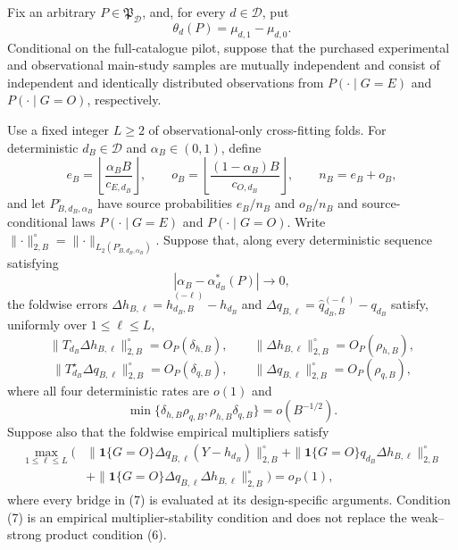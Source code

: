 Fix an arbitrary \(P\in\mathfrak P_{\mathcal D}\), and, for every \(d\in\mathcal D\), put
\[
 \theta_d(P)=\mu_{d,1}-\mu_{d,0}.                            \tag{1}
\]
Conditional on the full-catalogue pilot, suppose that the purchased experimental and observational main-study samples are mutually independent and consist of independent and identically distributed observations from \(P(\mathord\cdot\mid G=E)\) and \(P(\mathord\cdot\mid G=O)\), respectively.

Use a fixed integer \(L\ge2\) of observational-only cross-fitting folds.  For deterministic \(d_B\in\mathcal D\) and \(\alpha_B\in(0,1)\), define
\[
 e_B=\left\lfloor\frac{\alpha_BB}{c_{E,d_B}}\right\rfloor,
 \qquad
 o_B=\left\lfloor\frac{(1-\alpha_B)B}{c_{O,d_B}}\right\rfloor,
 \qquad n_B=e_B+o_B,                                        \tag{2}
\]
and let \(P_{B,d_B,\alpha_B}^{\circ}\) have source probabilities \(e_B/n_B\) and \(o_B/n_B\) and source-conditional laws \(P(\mathord\cdot\mid G=E)\) and \(P(\mathord\cdot\mid G=O)\).  Write \(\|\mathord\cdot\|_{2,B}^{\circ}=\|\mathord\cdot\|_{L_2(P_{B,d_B,\alpha_B}^{\circ})}\).  Suppose that, along every deterministic sequence satisfying
\[
 |\alpha_B-\alpha_{d_B}^*(P)|\longrightarrow0,               \tag{3}
\]
the foldwise errors \(\Delta h_{B,\ell}=\widehat h_{d_B,B}^{(-\ell)}-h_{d_B}\) and \(\Delta q_{B,\ell}=\widehat q_{d_B,B}^{(-\ell)}-q_{d_B}\) satisfy, uniformly over \(1\le\ell\le L\),
\[
 \|T_{d_B}\Delta h_{B,\ell}\|_{2,B}^{\circ}=O_P(\delta_{h,B}),
 \qquad
 \|\Delta h_{B,\ell}\|_{2,B}^{\circ}=O_P(\rho_{h,B}),       \tag{4}
\]
\[
 \|T_{d_B}^{\star}\Delta q_{B,\ell}\|_{2,B}^{\circ}=O_P(\delta_{q,B}),
 \qquad
 \|\Delta q_{B,\ell}\|_{2,B}^{\circ}=O_P(\rho_{q,B}),       \tag{5}
\]
where all four deterministic rates are \(o(1)\) and
\[
 \min\{\delta_{h,B}\rho_{q,B},\rho_{h,B}\delta_{q,B}\}
 =o(B^{-1/2}).                                                \tag{6}
\]
Suppose also that the foldwise empirical multipliers satisfy
\[
\begin{aligned}
 \max_{1\le\ell\le L}\bigl(&
 \|\mathbf 1\{G=O\}\Delta q_{B,\ell}(Y-h_{d_B})\|_{2,B}^{\circ}
 +\|\mathbf 1\{G=O\}q_{d_B}\Delta h_{B,\ell}\|_{2,B}^{\circ}\\
 &+\|\mathbf 1\{G=O\}\Delta q_{B,\ell}\Delta h_{B,\ell}\|_{2,B}^{\circ}
 \bigr)=o_P(1),
\end{aligned}                                                \tag{7}
\]
where every bridge in (7) is evaluated at its design-specific arguments.  Condition (7) is an empirical multiplier-stability condition and does not replace the weak--strong product condition (6).

